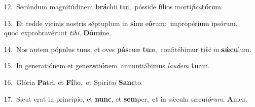 {\numbfont\textcolor{\numbcolor}{12.}}~Secúndum magnitúdinem \textbf{brá}\-chii \textbf{tu}\-i,~\star pósside fílios morti\-\textit{fi}\-\textit{ca}\textbf{tó}rum.\par
{\numbfont\textcolor{\numbcolor}{13.}}~Et redde vicínis nostris séptuplum in \textbf{si}\-nu e\-\textbf{ó}\-rum:~\star impropérium ipsórum, quod exprobravérunt \textit{ti}\-\textit{bi}, \textbf{Dó}\-\textbf{mi}ne.\par
{\numbfont\textcolor{\numbcolor}{14.}}~Nos autem pópulus tuus, et oves \textbf{pás}\-cuæ \textbf{tu}\-æ,~\star confitébimur ti\textit{bi} \textit{in} \textbf{sǽ}\-\textbf{cu}lum.\par
{\numbfont\textcolor{\numbcolor}{15.}}~In generatiónem et gene\-\textbf{ra}\-ti\-\textbf{ó}\-nem~\star annuntiábimus \textit{lau}\-\textit{dem} \textbf{tu}\-am.\par
{\numbfont\textcolor{\numbcolor}{16.}}~Glória \textbf{Pa}\-tri, et \textbf{Fí}\-lio,~\star et Spirí\-\textit{tu}\-\textit{i} \textbf{Sanc}\-to.\par
{\numbfont\textcolor{\numbcolor}{17.}}~Sicut erat in princípio, et \textbf{nunc}\-, et \textbf{sem}\-per,~\star et in sǽcula sæcu\-\textit{ló}\-\textit{rum}. \textbf{A}\-men.\par
